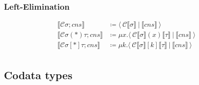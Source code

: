 \documentclass[11pt]{article}
\newcommand{\translate}[1]{\llbracket #1 \rrbracket}
\newcommand{\C}{\mathcal{C}}
\newcommand{\cut}[2]{\langle\ #1\ |\ #2\ \rangle}
\begin{document}
\subsubsection{Left-Elimination}

\begin{align*}
  \translate{\C\sigma;cns} &\coloneqq \cut{\C\translate{\sigma}}{\translate{cns}} \\
  \translate{\C\sigma(*)\tau;cns} &\coloneqq \mu x.\cut{\C\translate{\sigma}(x)\translate{\tau}}{\translate{cns}} \\
  \translate{\C\sigma[*]\tau;cns} &\coloneqq \mu k.\cut{\C\translate{\sigma}[k]\translate{\tau}}{\translate{cns}} \\
\end{align*}

\subsection{Codata types}
\end{document}
